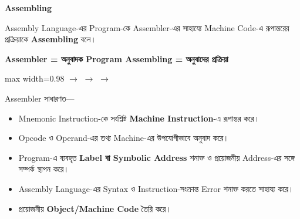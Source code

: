 
\begin{definitionbox}

\textbf{\color{darkTeal}Assembling}

Assembly Language-এর Program-কে Assembler-এর সাহায্যে
Machine Code-এ রূপান্তরের প্রক্রিয়াকে \textbf{Assembling} বলে।

\end{definitionbox}

\begin{center}

\textbf{
Assembler = অনুবাদক Program
\qquad
Assembling = অনুবাদের প্রক্রিয়া
}

\end{center}


\begin{center}
\begin{adjustbox}{max width=0.98\linewidth}
\quad
\(\longrightarrow\)
\quad
{}
\quad
\(\longrightarrow\)
\quad
{}
\quad
\(\longrightarrow\)
\quad
{}
\end{adjustbox}
\end{center}


Assembler সাধারণত—

\begin{itemize}

\item Mnemonic Instruction-কে সংশ্লিষ্ট
\textbf{Machine Instruction}-এ রূপান্তর করে।

\item Opcode ও Operand-এর তথ্য Machine-এর উপযোগীভাবে অনুবাদ করে।

\item Program-এ ব্যবহৃত \textbf{Label বা Symbolic Address}
শনাক্ত ও প্রয়োজনীয় Address-এর সঙ্গে সম্পর্ক স্থাপন করে।

\item Assembly Language-এর Syntax ও Instruction-সংক্রান্ত
Error শনাক্ত করতে সাহায্য করে।

\item প্রয়োজনীয় \textbf{Object/Machine Code} তৈরি করে।

\end{itemize}

